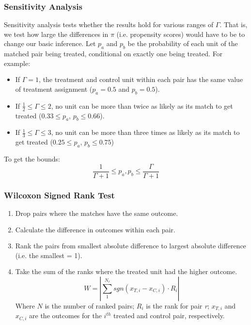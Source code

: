 \documentclass[10pt,slidestop,mathserif,c]{beamer}
\begin{document}
\begin{frame}
    \frametitle{Sensitivity Analysis}
    
    Sensitivity analysis tests whether the results hold for various ranges of $\Gamma$. That is, we test how large the differences in $\pi$ (i.e. propensity scores) would have to be to change our basic inference. Let $p_a$ and $p_b$ be the probability of each unit of the matched pair being treated, conditional on exactly one being treated. For example:
    
    \begin{itemize}
        \item If $\Gamma = 1$, the treatment and control unit within each pair has the same value of treatment assignment ($p_a = 0.5$ and $p_b = 0.5$).
        \item If $\frac{1}{2} \le \Gamma \le 2$, no unit can be more than twice as likely as its match to get treated ($0.33 \le p_a$, $p_b \le 0.66$).
        \item If $\frac{1}{3} \le \Gamma \le 3$, no unit can be more than three times as likely as its match to get treated ($0.25 \le p_a$, $p_b \le 0.75$)
    \end{itemize}
    To get the bounds:
    $$ \frac{1}{\Gamma +1 } \le p_a, p_b \le \frac{\Gamma}{\Gamma +1} $$
\end{frame}


\begin{frame}
    \frametitle{Wilcoxon Signed Rank Test}
    \begin{enumerate}
        \item Drop pairs where the matches have the same outcome.
        \item Calculate the difference in outcomes within each pair.
        \item Rank the pairs from smallest absolute difference to largest absolute difference (i.e. the smallest = 1).
        \item Take the sum of the ranks where the treated unit had the higher outcome.
        $$ W=\left| \sum _{ 1 }^{ { N }_{ r } }{ sgn({ x }_{ T,i }-{ x }_{ C,i })\cdot { R }_{ i } }  \right|  $$
        Where $N$ is the number of ranked pairs; $R_i$ is the rank for pair \textit{r}; $x_{T,i}$ and $x_{C,i}$ are the outcomes for the $i^{th}$ treated and control pair, respectively.
    \end{enumerate}
\end{frame}
\end{document}
